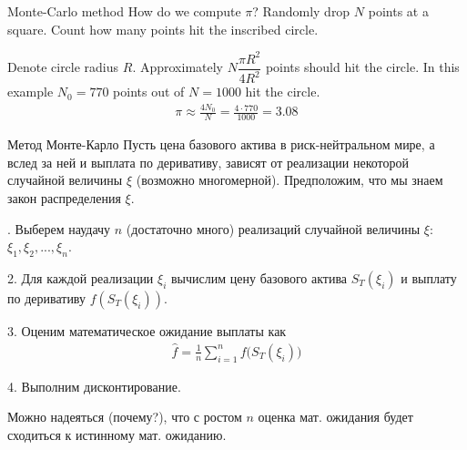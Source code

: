 \documentclass{beamer}
\begin{document}
\begin{frame}{Monte-Carlo method}
\justify
How do we compute $\pi$? Randomly drop $N$ points at a square. Count how many points hit the inscribed circle.

\centering
{}
\justify
Denote circle radius $R$. Approximately $N\dfrac{\pi R^2}{4R^2}$ points should hit the circle. In this example $N_0=770$ points out of $N=1000$ hit the circle. 
\begin{align*}
\pi \approx \frac{4N_0}{N} = \frac{4 \cdot 770}{1000} = 3.08
\end{align*}
\end{frame}



\begin{frame}{Метод Монте-Карло}
\justify
Пусть цена базового актива в риск-нейтральном мире, а вслед за ней и выплата по деривативу, зависят от реализации некоторой случайной величины $\xi$ (возможно многомерной). Предположим, что мы знаем закон распределения $\xi$.

. Выберем наудачу $n$ (достаточно много) реализаций случайной величины $\xi$: $\xi_1, \xi_2, ..., \xi_n$.

2. Для каждой реализации $\xi_i$ вычислим цену базового актива $S_T(\xi_i)$ и выплату по деривативу $f(S_T(\xi_i))$.

3. Оценим математическое ожидание выплаты как 
\begin{align*}
\hat{f} = \frac{1}{n}\sum\limits_{i=1}^{n}f\Big(S_T(\xi_i)\Big)
\end{align*}

4. Выполним дисконтирование.

\justify
Можно надеяться (почему?), что с ростом $n$ оценка мат. ожидания будет сходиться к истинному мат. ожиданию.
\end{frame}
\end{document}
